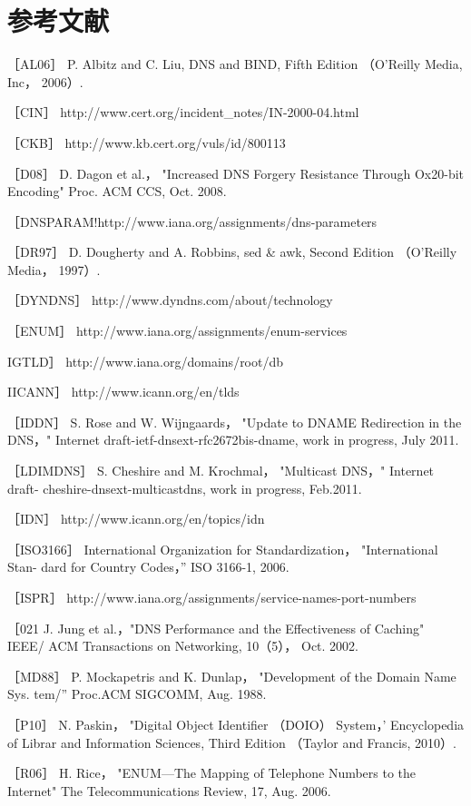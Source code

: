 \section{参考文献}

［AL06］ P. Albitz and C. Liu, DNS and BIND, Fifth Edition （O'Reilly Media, Inc，
2006）.

［CIN］ http://www.cert.org/incident\_notes/IN-2000-04.html

［CKB］ http://www.kb.cert.org/vuls/id/800113

［D08］ D. Dagon et al.， "Increased DNS Forgery Resistance Through Ox20-bit
Encoding" Proc. ACM CCS, Oct. 2008.

［DNSPARAM!http://www.iana.org/assignments/dns-parameters

［DR97］ D. Dougherty and A. Robbins, sed \& awk, Second Edition （O'Reilly Media，
1997）.

［DYNDNS］ http://www.dyndns.com/about/technology

［ENUM］ http://www.iana.org/assignments/enum-services

IGTLD］ http://www.iana.org/domains/root/db

IICANN］ http://www.icann.org/en/tlds

［IDDN］ S. Rose and W. Wijngaards， "Update to DNAME Redirection in the
DNS，" Internet draft-ietf-dnsext-rfc2672bis-dname, work in progress, July 2011.

［LDIMDNS］ S. Cheshire and M. Krochmal， "Multicast DNS，" Internet draft-
cheshire-dnsext-multicastdns, work in progress, Feb.2011.

［IDN］ http://www.icann.org/en/topics/idn

［ISO3166］ International Organization for Standardization， "International Stan-
dard for Country Codes，” ISO 3166-1, 2006.

［ISPR］ http://www.iana.org/assignments/service-names-port-numbers

［021 J. Jung et al.，"DNS Performance and the Effectiveness of Caching" IEEE/
ACM Transactions on Networking, 10（5）， Oct. 2002.

［MD88］ P. Mockapetris and K. Dunlap， "Development of the Domain Name Sys.
tem/” Proc.ACM SIGCOMM, Aug. 1988.

［P10］ N. Paskin， "Digital Object Identifier （DOIO） System，'
Encyclopedia of Librar
and Information Sciences, Third Edition （Taylor and Francis, 2010）.

［R06］ H. Rice， "ENUM—The Mapping of Telephone Numbers to the Internet"
The Telecommunications Review, 17, Aug. 2006.

